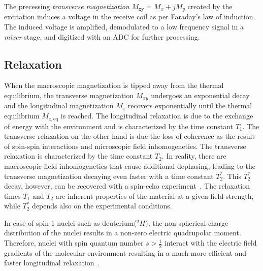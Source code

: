 The precessing \emph{transverse magnetization} $M_\text{xy}=M_x+jM_y$ created by the excitation induces a voltage in the receive coil as per Faraday's law of induction. The induced voltage is amplified, demodulated to a low frequency signal in a \emph{mixer} stage, and digitized with an \gls{ADC} for further processing.   
\subsection{Relaxation}
When the macroscopic magnetization is tipped away from the thermal equilibrium, the transverse magnetization $M_{xy}$ undergoes an exponential decay and the longitudinal magnetization $M_z$ recovers exponentially until the thermal equilibrium $M_{z,\text{eq}}$ is reached. The longitudinal relaxation is due to the exchange of energy with the environment and is characterized by the time constant $T_1$. The transverse relaxation on the other hand is due the loss of coherence as the result of spin-spin interactions and microscopic field inhomogeneties. The transverse relaxation is characterized by the time constant $T_2$. In reality, there are macroscopic field inhomogeneties that cause additional dephasing, leading to the transverse magnetization decaying even faster with a time constant $T_2^*$. This $T_2^*$ decay, however, can be recovered with a spin-echo experiment~\cite{hahnSpinEchoes1950}. The relaxation times $T_1$ and $T_2$ are inherent properties of the material at a given field strength, while $T_2^*$ depends also on the experimental conditions. 

In case of spin-1 nuclei such as deuterium($^2H$), the non-spherical charge distribution of the nuclei results in a non-zero electric quadrupolar moment. Therefore, nuclei with spin quantum number $s> \frac{1}{2}$ interact with the electric field gradients of the molecular environment resulting in a much more efficient and faster longitudinal relaxation~\cite{levittSpinDynamicsBasics}.    
